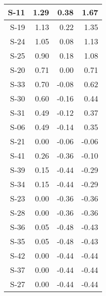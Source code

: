 \begin{tabular}{ | r | r | r | r | }
    \hline
                  S-11  &            1.29  &            0.38  &            1.67  \\
    \hline
                  S-19  &            1.13  &            0.22  &            1.35  \\
    \hline
                  S-24  &            1.05  &            0.08  &            1.13  \\
    \hline
                  S-25  &            0.90  &            0.18  &            1.08  \\
    \hline
                  S-20  &            0.71  &            0.00  &            0.71  \\
    \hline
                  S-33  &            0.70  &           -0.08  &            0.62  \\
    \hline
                  S-30  &            0.60  &           -0.16  &            0.44  \\
    \hline
                  S-31  &            0.49  &           -0.12  &            0.37  \\
    \hline
                  S-06  &            0.49  &           -0.14  &            0.35  \\
    \hline
                  S-21  &            0.00  &           -0.06  &           -0.06  \\
    \hline
                  S-41  &            0.26  &           -0.36  &           -0.10  \\
    \hline
                  S-39  &            0.15  &           -0.44  &           -0.29  \\
    \hline
                  S-34  &            0.15  &           -0.44  &           -0.29  \\
    \hline
                  S-23  &            0.00  &           -0.36  &           -0.36  \\
    \hline
                  S-28  &            0.00  &           -0.36  &           -0.36  \\
    \hline
                  S-36  &            0.05  &           -0.48  &           -0.43  \\
    \hline
                  S-35  &            0.05  &           -0.48  &           -0.43  \\
    \hline
                  S-42  &            0.00  &           -0.44  &           -0.44  \\
    \hline
                  S-37  &            0.00  &           -0.44  &           -0.44  \\
    \hline
                  S-27  &            0.00  &           -0.44  &           -0.44  \\

\end{tabular}
